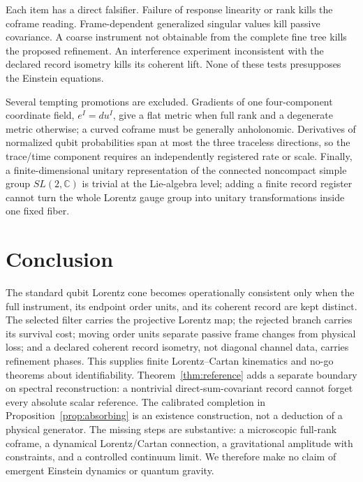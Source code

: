 \documentclass[11pt]{article}
\theoremstyle{remark}
\begin{document}
Each item has a direct falsifier.  Failure of response linearity or rank kills the coframe
reading.  Frame-dependent generalized singular values kill passive covariance.  A coarse
instrument not obtainable from the complete fine tree kills the proposed refinement.  An
interference experiment inconsistent with the declared record isometry kills its coherent
lift.  None of these tests presupposes the Einstein equations.

Several tempting promotions are excluded.  Gradients of one four-component coordinate
field, $e^I=du^I$, give a flat metric when full rank and a degenerate metric otherwise; a
curved coframe must be generally anholonomic.  Derivatives of normalized qubit probabilities
span at most the three traceless directions, so the trace/time component requires an
independently registered rate or scale.  Finally, a finite-dimensional unitary
representation of the connected noncompact simple group $SL(2,\mathbb C)$ is trivial at
the Lie-algebra level; adding a finite record register cannot turn the whole Lorentz gauge
group into unitary transformations inside one fixed fiber.

\section{Conclusion}

The standard qubit Lorentz cone becomes operationally consistent only when the full
instrument, its endpoint order units, and its coherent record are kept distinct.  The
selected filter carries the projective Lorentz map; the rejected branch carries its
survival cost; moving order units separate passive frame changes from physical loss; and a
declared coherent record isometry, not diagonal channel data, carries refinement phases.
This supplies finite Lorentz--Cartan kinematics and no-go theorems about identifiability.
Theorem~\ref{thm:reference} adds a separate boundary on spectral reconstruction: a
nontrivial direct-sum-covariant record cannot forget every absolute scalar reference.
The calibrated completion in Proposition~\ref{prop:absorbing} is an existence construction,
not a deduction of a physical generator.
The missing steps are substantive: a microscopic full-rank coframe, a dynamical
Lorentz/Cartan connection, a gravitational amplitude with constraints, and a controlled
continuum limit.  We therefore make no claim of emergent Einstein dynamics or quantum
gravity.

\appendix
\end{document}
